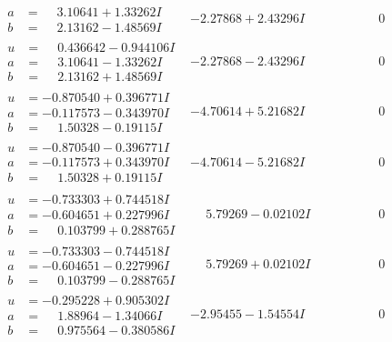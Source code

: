 \documentclass[1p]{elsarticle_modified}
\theoremstyle{definition}
\begin{document}
$$\begin{array}{c|c|c}
\begin{aligned}
a &= \phantom{-}3.10641 + 1.33262 I \\
b &= \phantom{-}2.13162 - 1.48569 I\end{aligned}
 & -2.27868 + 2.43296 I & \phantom{-0.000000 } 0 \\ \hline\begin{aligned}
u &= \phantom{-}0.436642 - 0.944106 I \\
a &= \phantom{-}3.10641 - 1.33262 I \\
b &= \phantom{-}2.13162 + 1.48569 I\end{aligned}
 & -2.27868 - 2.43296 I & \phantom{-0.000000 } 0 \\ \hline\begin{aligned}
u &= -0.870540 + 0.396771 I \\
a &= -0.117573 - 0.343970 I \\
b &= \phantom{-}1.50328 - 0.19115 I\end{aligned}
 & -4.70614 + 5.21682 I & \phantom{-0.000000 } 0 \\ \hline\begin{aligned}
u &= -0.870540 - 0.396771 I \\
a &= -0.117573 + 0.343970 I \\
b &= \phantom{-}1.50328 + 0.19115 I\end{aligned}
 & -4.70614 - 5.21682 I & \phantom{-0.000000 } 0 \\ \hline\begin{aligned}
u &= -0.733303 + 0.744518 I \\
a &= -0.604651 + 0.227996 I \\
b &= \phantom{-}0.103799 + 0.288765 I\end{aligned}
 & \phantom{-}5.79269 - 0.02102 I & \phantom{-0.000000 } 0 \\ \hline\begin{aligned}
u &= -0.733303 - 0.744518 I \\
a &= -0.604651 - 0.227996 I \\
b &= \phantom{-}0.103799 - 0.288765 I\end{aligned}
 & \phantom{-}5.79269 + 0.02102 I & \phantom{-0.000000 } 0 \\ \hline\begin{aligned}
u &= -0.295228 + 0.905302 I \\
a &= \phantom{-}1.88964 - 1.34066 I \\
b &= \phantom{-}0.975564 - 0.380586 I\end{aligned}
 & -2.95455 - 1.54554 I & \phantom{-0.000000 } 0 \\ \hline\begin{aligned}

\end{aligned}
\end{array}$$
\end{document}
